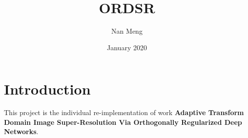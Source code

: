 \documentclass{article}
\title{ORDSR}
\author{Nan Meng}
\date{January 2020}
\begin{document}
\maketitle

\section{Introduction}
This project is the individual re-implementation of work \textbf{Adaptive Transform Domain Image Super-Resolution Via Orthogonally Regularized Deep Networks}.
\end{document}
